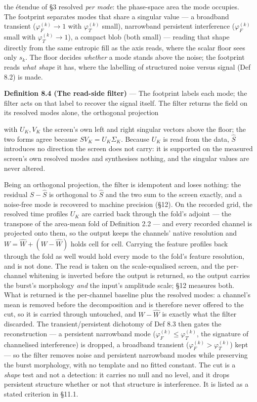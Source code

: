 \documentclass[10pt,letterpaper,twocolumn]{article}
\begin{document}
the étendue of §3 resolved \emph{per mode}: the phase-space area the mode occupies. The footprint separates modes that share a singular value --- a broadband transient (\(\varphi^{(k)}_F\to1\) with \(\varphi^{(k)}_T\) small), narrowband persistent interference (\(\varphi^{(k)}_F\) small with \(\varphi^{(k)}_T\to1\)), a compact blob (both small) --- reading that shape directly from the same entropic fill as the axis reads, where the scalar floor sees only \(s_k\). The floor decides \emph{whether} a mode stands above the noise; the footprint reads \emph{what shape} it has, where the labelling of structured noise versus signal (Def 8.2) is made.

\textbf{Definition 8.4 (The read-side filter)} --- The footprint labels each mode; the filter acts on that label to recover the signal itself. The filter returns the field on its resolved modes alone, the orthogonal projection


with \(U_K,V_K\) the screen's own left and right singular vectors above the floor; the two forms agree because \(SV_K=U_K\Sigma_K\). Because \(U_K\) is read from the data, \(\widehat S\) introduces no direction the screen does not carry: it is supported on the measured screen's own resolved modes and synthesises nothing, and the singular values are never altered.

Being an orthogonal projection, the filter is idempotent and loses nothing: the residual \(S-\widehat S\) is orthogonal to \(\widehat S\) and the two sum to the screen exactly, and a noise-free mode is recovered to machine precision (§12). On the recorded grid, the resolved time profiles \(U_K\) are carried back through the fold's adjoint --- the transpose of the area-mean fold of Definition 2.2 --- and every recorded channel is projected onto them, so the output keeps the channels' native resolution and \(W=\widehat W+(W-\widehat W)\) holds cell for cell. Carrying the feature profiles back through the fold as well would hold every mode to the fold's feature resolution, and is not done. The read is taken on the scale-equalised screen, and the per-channel whitening is inverted before the output is returned, so the output carries the burst's morphology \emph{and} the input's amplitude scale; §12 measures both. What is returned is the per-channel baseline plus the resolved modes: a channel's mean is removed before the decomposition and is therefore never offered to the cut, so it is carried through untouched, and \(W-\widehat W\) is exactly what the filter discarded. The transient/persistent dichotomy of Def 8.3 then gates the reconstruction --- a persistent narrowband mode (\(\varphi^{(k)}_F\le\varphi^{(k)}_T\), the signature of channelised interference) is dropped, a broadband transient (\(\varphi^{(k)}_F>\varphi^{(k)}_T\)) kept --- so the filter removes noise and persistent narrowband modes while preserving the burst morphology, with no template and no fitted constant. The cut is a \emph{shape} test and not a detection: it carries no null and no level, and it drops persistent structure whether or not that structure is interference. It is listed as a stated criterion in §11.1.
\end{document}
